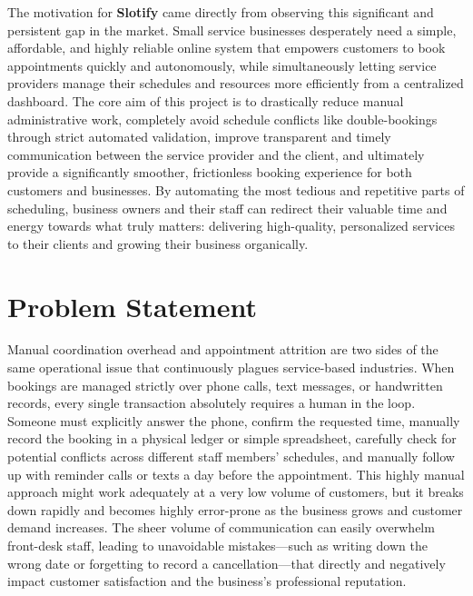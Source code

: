 The motivation for \textbf{Slotify} came directly from observing this significant and persistent gap in the market. Small service businesses desperately need a simple, affordable, and highly reliable online system that empowers customers to book appointments quickly and autonomously, while simultaneously letting service providers manage their schedules and resources more efficiently from a centralized dashboard. The core aim of this project is to drastically reduce manual administrative work, completely avoid schedule conflicts like double-bookings through strict automated validation, improve transparent and timely communication between the service provider and the client, and ultimately provide a significantly smoother, frictionless booking experience for both customers and businesses. By automating the most tedious and repetitive parts of scheduling, business owners and their staff can redirect their valuable time and energy towards what truly matters: delivering high-quality, personalized services to their clients and growing their business organically.

\section{Problem Statement}
Manual coordination overhead and appointment attrition are two sides of the same operational issue that continuously plagues service-based industries. When bookings are managed strictly over phone calls, text messages, or handwritten records, every single transaction absolutely requires a human in the loop. Someone must explicitly answer the phone, confirm the requested time, manually record the booking in a physical ledger or simple spreadsheet, carefully check for potential conflicts across different staff members' schedules, and manually follow up with reminder calls or texts a day before the appointment. This highly manual approach might work adequately at a very low volume of customers, but it breaks down rapidly and becomes highly error-prone as the business grows and customer demand increases. The sheer volume of communication can easily overwhelm front-desk staff, leading to unavoidable mistakes—such as writing down the wrong date or forgetting to record a cancellation—that directly and negatively impact customer satisfaction and the business's professional reputation.

